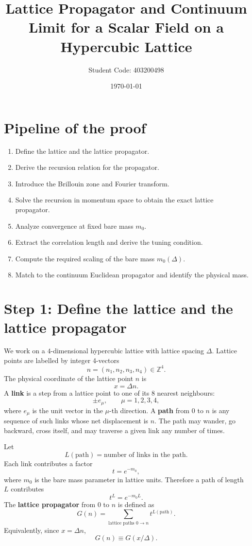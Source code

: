 \documentclass[12pt]{article}
\title{Lattice Propagator and Continuum Limit for a Scalar Field on a Hypercubic Lattice}
\author{Student Code: 403200498}
\date{\today}
\begin{document}
\maketitle

\section*{Pipeline of the proof}
\begin{enumerate}[label=\textbf{\arabic*.}]
    \item Define the lattice and the lattice propagator.
    \item Derive the recursion relation for the propagator.
    \item Introduce the Brillouin zone and Fourier transform.
    \item Solve the recursion in momentum space to obtain the exact lattice propagator.
    \item Analyze convergence at fixed bare mass \(m_0\).
    \item Extract the correlation length and derive the tuning condition.
    \item Compute the required scaling of the bare mass \(m_0(\Delta)\).
    \item Match to the continuum Euclidean propagator and identify the physical mass.
\end{enumerate}

\section{Step 1: Define the lattice and the lattice propagator}

We work on a \(4\)-dimensional hypercubic lattice with lattice spacing \(\Delta\).  
Lattice points are labelled by integer 4-vectors
\[
n=(n_1,n_2,n_3,n_4)\in\mathbb Z^4 .
\]
The physical coordinate of the lattice point \(n\) is
\[
x=\Delta n .
\]
A \textbf{link} is a step from a lattice point to one of its \(8\) nearest neighbours:
\[
\pm e_\mu,\qquad \mu=1,2,3,4,
\]
where \(e_\mu\) is the unit vector in the \(\mu\)-th direction.  
A \textbf{path} from \(0\) to \(n\) is any sequence of such links whose net displacement is \(n\).  
The path may wander, go backward, cross itself, and may traverse a given link any number of times.

Let
\[
L(\text{path})=\text{number of links in the path}.
\]
Each link contributes a factor
\[
t=e^{-m_0},
\]
where \(m_0\) is the bare mass parameter in lattice units.  
Therefore a path of length \(L\) contributes
\[
t^L=e^{-m_0 L}.
\]
The \textbf{lattice propagator} from \(0\) to \(n\) is defined as
\begin{equation}
\boxed{
G(n)=\sum_{\text{lattice paths }0\to n} t^{L(\text{path})}.
}
\tag{1}
\end{equation}
Equivalently, since \(x=\Delta n\),
\[
G(n)\equiv G(x/\Delta).
\]
\end{document}
